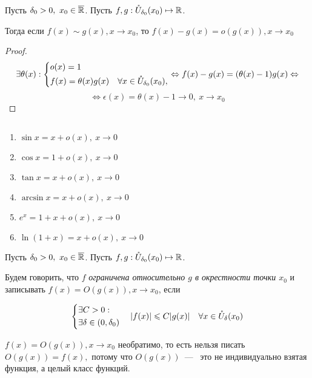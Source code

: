 \begin{lemma}
    Пусть $\delta_{0} > 0, \ x_{0} \in \overline{\mathbb{R}}$. Пусть $f, g: \mathring{U}_{\delta_{0}}(x_{0}) \mapsto \mathbb{R}$.

    Тогда если $f(x) \sim g(x), x\to x_{0}$, то $f(x) - g(x) = o(g(x)), x\to x_{0}$
\end{lemma}
\begin{proof}
    $$\exists \theta(x): \left\{
    \begin{gathered}
        o(x) = 1 \hfill \\
        f(x) = \theta(x) g(x) \quad \forall x\in \mathring{U}_{\delta_{0}}(x_{0}), 
    \end{gathered} \right. \Leftrightarrow f(x) - g(x) = (\theta(x) - 1)g(x) \Leftrightarrow 
    $$
    $$\Leftrightarrow 
    \epsilon(x) = \theta(x) -1 \to 0, \ x\to x_{0}$$
\end{proof}

\begin{examples} $\ $
        \begin{enumerate}
        \item $\sin x = x + o(x), \ x\to 0$
        \item $\cos x = 1 + o(x),\ x\to 0$
        \item $\tan x = x + o(x),\ x \to 0$
        \item $\arcsin x = x + o(x),\ x \to 0$
        \item $e^{x} = 1+x + o(x),\ x\to 0$
        \item $\ln(1+x) = x + o(x),\ x\to 0$
    \end{enumerate}
\end{examples}

\begin{definition}
     Пусть $\delta_{0} > 0, \ x_{0} \in \overline{\mathbb{R}}$. Пусть $f, g: \mathring{U}_{\delta_{0}}(x_{0}) \mapsto \mathbb{R}$.

     Будем говорить, что $f$ \textit{ограничена относительно $g$ в окрестности точки $x_{0}$} и записывать $f(x) = O(g(x)), x\to x_{0}$, если 

     $$
     \left\{
     \begin{gathered}
         \exists C > 0: \hfill \\
         \exists \delta \in (0, \delta_{0})
     \end{gathered} \right.
     \quad |f(x)| \leq C|g(x)| \quad \forall x\in \mathring{U}_{\delta} (x_{0})
     $$
\end{definition}
\begin{note} 
    $f(x) = O(g(x)), x \to x_{0}$ необратимо, то есть нельзя писать $O(g(x)) = f(x),$ потому что $O(g(x))$~---~ это не индивидуально взятая функция, а целый класс функций. 
\end{note}

